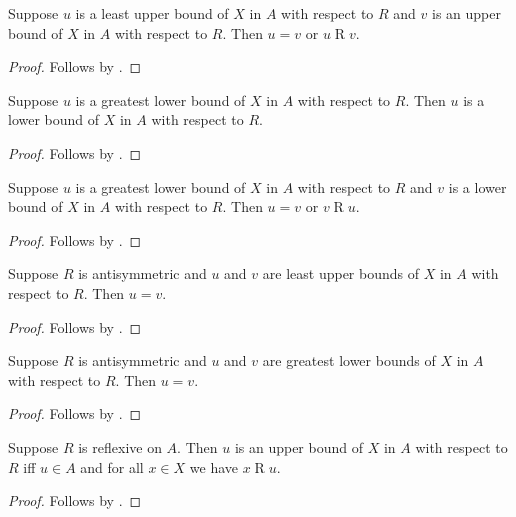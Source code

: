 \begin{proposition}\label{least_upper_bound_is_least}
    Suppose $u$ is a least upper bound of $X$ in $A$ with respect to $R$ and
        $v$ is an upper bound of $X$ in $A$ with respect to $R$.
    Then $u=v$ or $u\mathrel{R}v$.
\end{proposition}
\begin{proof}
    Follows by .
\end{proof}

\begin{proposition}\label{greatest_lower_bound_is_lower_bound}
    Suppose $u$ is a greatest lower bound of $X$ in $A$ with respect to $R$.
    Then $u$ is a lower bound of $X$ in $A$ with respect to $R$.
\end{proposition}
\begin{proof}
    Follows by .
\end{proof}

\begin{proposition}\label{greatest_lower_bound_is_greatest}
    Suppose $u$ is a greatest lower bound of $X$ in $A$ with respect to $R$ and
        $v$ is a lower bound of $X$ in $A$ with respect to $R$.
    Then $u=v$ or $v\mathrel{R}u$.
\end{proposition}
\begin{proof}
    Follows by .
\end{proof}

\begin{proposition}\label{least_upper_bound_unique}
    Suppose $R$ is antisymmetric and
        $u$ and $v$ are least upper bounds of $X$ in $A$ with respect to $R$.
    Then $u=v$.
\end{proposition}
\begin{proof}
    Follows by .
\end{proof}

\begin{proposition}\label{greatest_lower_bound_unique}
    Suppose $R$ is antisymmetric and
        $u$ and $v$ are greatest lower bounds of $X$ in $A$ with respect to $R$.
    Then $u=v$.
\end{proposition}
\begin{proof}
    Follows by .
\end{proof}

\begin{proposition}\label{upper_bound_iff_reflexive_on}
    Suppose $R$ is reflexive on $A$.
    Then $u$ is an upper bound of $X$ in $A$ with respect to $R$ iff
        $u\in A$ and for all $x\in X$ we have $x\mathrel{R}u$.
\end{proposition}
\begin{proof}
    Follows by .
\end{proof}


